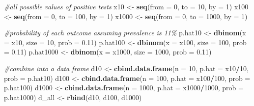 \documentclass[
]{book}
\newenvironment{Shaded}{\begin{snugshade}}{\end{snugshade}}
\newcommand{\AttributeTok}[1]{\textcolor[rgb]{0.13,0.29,0.53}{#1}}
\newcommand{\CommentTok}[1]{\textcolor[rgb]{0.56,0.35,0.01}{\textit{#1}}}
\newcommand{\DecValTok}[1]{\textcolor[rgb]{0.00,0.00,0.81}{#1}}
\newcommand{\FloatTok}[1]{\textcolor[rgb]{0.00,0.00,0.81}{#1}}
\newcommand{\FunctionTok}[1]{\textcolor[rgb]{0.13,0.29,0.53}{\textbf{#1}}}
\newcommand{\NormalTok}[1]{#1}
\newcommand{\OtherTok}[1]{\textcolor[rgb]{0.56,0.35,0.01}{#1}}
\newcommand{\SpecialCharTok}[1]{\textcolor[rgb]{0.81,0.36,0.00}{\textbf{#1}}}
\begin{document}
\begin{Shaded}
\begin{Highlighting}[]
\CommentTok{\#all possible values of positive tests}
\NormalTok{x10 }\OtherTok{\textless{}{-}} \FunctionTok{seq}\NormalTok{(}\AttributeTok{from =} \DecValTok{0}\NormalTok{, }\AttributeTok{to =} \DecValTok{10}\NormalTok{, }\AttributeTok{by =} \DecValTok{1}\NormalTok{)}
\NormalTok{x100 }\OtherTok{\textless{}{-}} \FunctionTok{seq}\NormalTok{(}\AttributeTok{from =} \DecValTok{0}\NormalTok{, }\AttributeTok{to =} \DecValTok{100}\NormalTok{, }\AttributeTok{by =} \DecValTok{1}\NormalTok{)}
\NormalTok{x1000 }\OtherTok{\textless{}{-}} \FunctionTok{seq}\NormalTok{(}\AttributeTok{from =} \DecValTok{0}\NormalTok{, }\AttributeTok{to =} \DecValTok{1000}\NormalTok{, }\AttributeTok{by =} \DecValTok{1}\NormalTok{)}

\CommentTok{\#probability of each outcome assuming prevalence is 11\%}
\NormalTok{p.hat10 }\OtherTok{\textless{}{-}} \FunctionTok{dbinom}\NormalTok{(}\AttributeTok{x =}\NormalTok{ x10, }\AttributeTok{size =} \DecValTok{10}\NormalTok{, }\AttributeTok{prob =} \FloatTok{0.11}\NormalTok{)}
\NormalTok{p.hat100 }\OtherTok{\textless{}{-}} \FunctionTok{dbinom}\NormalTok{(}\AttributeTok{x =}\NormalTok{ x100, }\AttributeTok{size =} \DecValTok{100}\NormalTok{, }\AttributeTok{prob =} \FloatTok{0.11}\NormalTok{)}
\NormalTok{p.hat1000 }\OtherTok{\textless{}{-}} \FunctionTok{dbinom}\NormalTok{(}\AttributeTok{x =}\NormalTok{ x1000, }\AttributeTok{size =} \DecValTok{1000}\NormalTok{, }\AttributeTok{prob =} \FloatTok{0.11}\NormalTok{)}

\CommentTok{\#combine into a data frame}
\NormalTok{d10 }\OtherTok{\textless{}{-}} \FunctionTok{cbind.data.frame}\NormalTok{(}\AttributeTok{n =} \DecValTok{10}\NormalTok{, }\AttributeTok{p.hat =}\NormalTok{ x10}\SpecialCharTok{/}\DecValTok{10}\NormalTok{, }\AttributeTok{prob =}\NormalTok{ p.hat10)}
\NormalTok{d100 }\OtherTok{\textless{}{-}} \FunctionTok{cbind.data.frame}\NormalTok{(}\AttributeTok{n =} \DecValTok{100}\NormalTok{, }\AttributeTok{p.hat =}\NormalTok{ x100}\SpecialCharTok{/}\DecValTok{100}\NormalTok{, }\AttributeTok{prob =}\NormalTok{ p.hat100)}
\NormalTok{d1000 }\OtherTok{\textless{}{-}} \FunctionTok{cbind.data.frame}\NormalTok{(}\AttributeTok{n =} \DecValTok{1000}\NormalTok{, }\AttributeTok{p.hat =}\NormalTok{ x1000}\SpecialCharTok{/}\DecValTok{1000}\NormalTok{, }\AttributeTok{prob =}\NormalTok{ p.hat1000)}
\NormalTok{d\_all }\OtherTok{\textless{}{-}} \FunctionTok{rbind}\NormalTok{(d10, d100, d1000)}
\end{Highlighting}
\end{Shaded}
\end{document}
